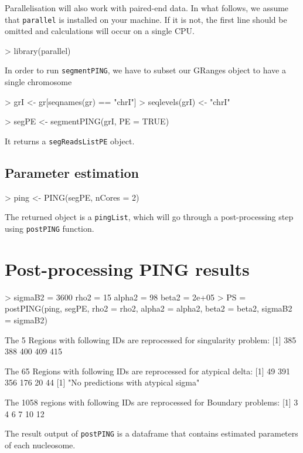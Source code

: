 \documentclass[11pt]{article}
\begin{document}
Parallelisation will also work with paired-end data. In what follows, we assume that \texttt{parallel} is installed on your machine. If it is not, the first line should be omitted and calculations will occur on a single CPU.

\begin{Schunk}
\begin{Sinput}
> library(parallel)
\end{Sinput}
\end{Schunk}

In order to run \texttt{segmentPING}, we have to subset our GRanges object to have a single chromosome
\begin{Schunk}
\begin{Sinput}
> grI <- gr[seqnames(gr) == "chrI"]
> seqlevels(grI) <- "chrI"
\end{Sinput}
\end{Schunk}

\begin{Schunk}
\begin{Sinput}
> segPE <- segmentPING(grI, PE = TRUE)
\end{Sinput}
\end{Schunk}

It returns a \texttt{segReadsListPE} object.


\subsection{Parameter estimation}

\begin{Schunk}
\begin{Sinput}
> ping <- PING(segPE, nCores = 2)
\end{Sinput}
\end{Schunk}
The returned object is a \texttt{pingList}, which will go through a post-processing step using \texttt{postPING} function.


\section{Post-processing PING results}

\begin{Schunk}
\begin{Sinput}
> {
     sigmaB2 = 3600
     rho2 = 15
     alpha2 = 98
     beta2 = 2e+05
 }
> PS = postPING(ping, segPE, rho2 = rho2, alpha2 = alpha2, beta2 = beta2, 
     sigmaB2 = sigmaB2)
\end{Sinput}
\begin{Soutput}
 The 5 Regions with following IDs are reprocessed for singularity problem: 
[1] 385 388 400 409 415

 The 65 Regions with following IDs are reprocessed for atypical delta: 
[1]  49 391 356 176  20  44
[1] "No predictions with atypical sigma"

 The 1058 regions with following IDs are reprocessed for Boundary problems: 
[1]  3  4  6  7 10 12
\end{Soutput}
\end{Schunk}
The result output of \texttt{postPING} is a dataframe that contains estimated parameters of each nucleosome.
\end{document}
